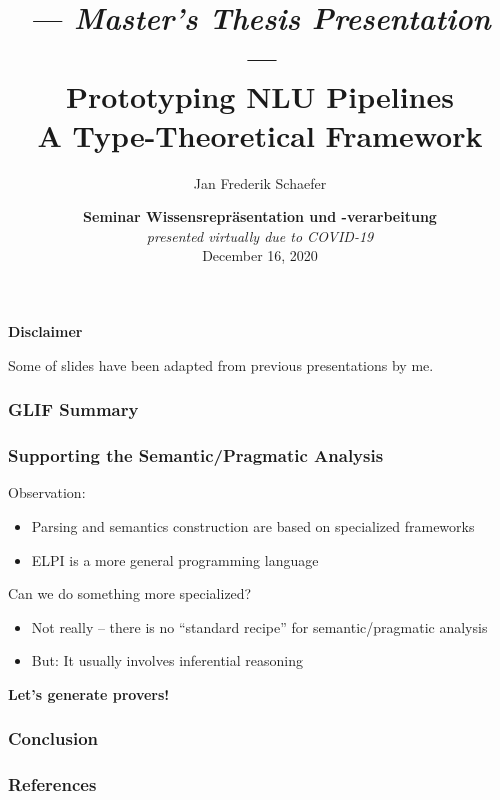 \documentclass[aspectratio=169]{beamer}
\title{{\footnotesize\itshape --- Master's Thesis Presentation ---}\\[1pt] Prototyping NLU Pipelines\\[3pt] \normalsize A Type-Theoretical Framework}
\author{Jan Frederik Schaefer}
\institute{FAU Erlangen-N\"urnberg}
\date{\textbf{Seminar Wissensrepr\"asentation und -verarbeitung} \\ \textit{presented virtually due to COVID-19} \\ December 16, 2020 }
\begin{document}
\frame\titlepage

\begin{frame}
    \centering
    \textbf{Disclaimer}

    \vspace{1em}
    Some of slides have been adapted from previous presentations by me.
\end{frame}






{
    
}






\begin{frame}
    \frametitle{GLIF Summary}
    
\end{frame}

\begin{frame}
    \frametitle{Supporting the Semantic/Pragmatic Analysis}
    Observation:
    \begin{itemize}
        \item Parsing and semantics construction are based on specialized frameworks
        \item ELPI is a more general programming language
    \end{itemize}
    
    \vspace{1em}
    Can we do something more specialized?
    \begin{itemize}
        \item Not really -- there is no ``standard recipe'' for
            semantic/pragmatic analysis
        \item But: It usually involves inferential reasoning
    \end{itemize}

    \vspace{2em}
    \centering
    \bfseries Let's generate provers!\par
\end{frame}



\begin{frame}
    \frametitle{Conclusion}
    
\end{frame}

\appendix

\begin{frame}[allowframebreaks,t]
    \frametitle{References}
    \printbibliography
\end{frame}
\end{document}
